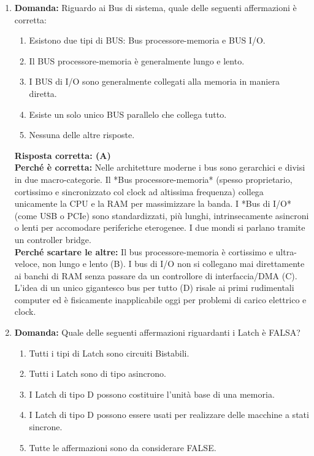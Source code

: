 \documentclass[12pt, a4paper]{article}
\begin{document}
\begin{enumerate}
    \item \textbf{Domanda:} Riguardo ai Bus di sistema, quale delle seguenti affermazioni è corretta:
    \begin{enumerate}[label=(\Alph*)]
        \item Esistono due tipi di BUS: Bus processore-memoria e BUS I/O.
        \item Il BUS processore-memoria è generalmente lungo e lento.
        \item I BUS di I/O sono generalmente collegati alla memoria in maniera diretta.
        \item Esiste un solo unico BUS parallelo che collega tutto.
        \item Nessuna delle altre risposte.
    \end{enumerate}
    \textbf{Risposta corretta: (A)} \\
    \textbf{Perché è corretta:} Nelle architetture moderne i bus sono gerarchici e divisi in due macro-categorie. Il *Bus processore-memoria* (spesso proprietario, cortissimo e sincronizzato col clock ad altissima frequenza) collega unicamente la CPU e la RAM per massimizzare la banda. I *Bus di I/O* (come USB o PCIe) sono standardizzati, più lunghi, intrinsecamente asincroni o lenti per accomodare periferiche eterogenee. I due mondi si parlano tramite un controller bridge. \\
    \textbf{Perché scartare le altre:} Il bus processore-memoria è cortissimo e ultra-veloce, non lungo e lento (B). I bus di I/O non si collegano mai direttamente ai banchi di RAM senza passare da un controllore di interfaccia/DMA (C). L'idea di un unico gigantesco bus per tutto (D) risale ai primi rudimentali computer ed è fisicamente inapplicabile oggi per problemi di carico elettrico e clock.

    \item \textbf{Domanda:} Quale delle seguenti affermazioni riguardanti i Latch è FALSA?
    \begin{enumerate}[label=(\Alph*)]
        \item Tutti i tipi di Latch sono circuiti Bistabili.
        \item Tutti i Latch sono di tipo asincrono.
        \item I Latch di tipo D possono costituire l'unità base di una memoria.
        \item I Latch di tipo D possono essere usati per realizzare delle macchine a stati sincrone.
        \item Tutte le affermazioni sono da considerare FALSE.
    \end{enumerate}


\end{enumerate}
\end{document}
